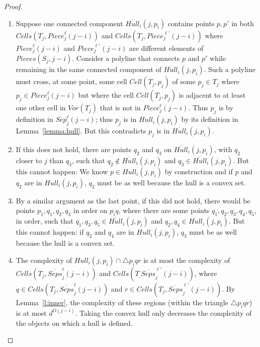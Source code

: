 \documentclass[10pt,a4paper]{amsart}
\newcommand{\Cell}{\mathit{Cell}}
\newcommand{\Cells}{\mathit{Cells}}
\newcommand{\Piece}{\mathit{Piece}}
\newcommand{\Sep}{\mathit{Sep}}
\newcommand{\Hull}{\mathit{Hull}}
\newcommand{\Voron}{\mathit{Vor}}
\begin{document}
\begin{proof}
    \begin{enumerate}
        \item \label{p1} Suppose one connected component $\overline{\Hull}_i(j,p_i)$ contains points $p,p'$ in  both 
    $\Cells(T_j,\Piece^\ell_j(j-i))$ and $\Cells(T_j,\Piece^{\ell'}_j(j-i))$ where $\Piece^\ell_j(j-i)$ and $\Piece^{\ell'}_j(j-i)$ are 
        different elements of $Pieces(S_j,j-i)$. Consider a polyline that connects $p$ and $p'$ while remaining in the same connected component of $\overline{\Hull}_i(j,p_i)$. Such a polyline must cross, at some point, some cell $\Cell(T_j,p_j)$ of some $p_j \in T_j$ where $p_j \in \Piece^\ell_j(j-i)$ but 
        where the cell $\Cell(T_j,p_j)$ is adjacent to at least one other cell in $\Voron(T_j)$ that is not in $\Piece^\ell_j(j-i)$.
        Thus $p_j$ is  by definition in $\Sep_j^\ell(j-i)$; thus $p_j$ is in $\Hull_i(j,p_i)$ by its definition in Lemma~\ref{lemma:hull}. But this contradicts $p_j$ is in  $\overline{\Hull}_i(j,p_i)$.
        \item \label{p2} 
        If this does not hold, there are points $q_2$ and $q_3$ on $\overline{\Hull}_i(j,p_i)$, with $q_2$ closer to $j$ than $q_3$, such that $q_2\not\in \overline{\Hull}_i(j,p_i)$ and $q_3 \in \overline{\Hull}_i(j,p_i)$.
         But this cannot happen: We know $p\in Hull_i(j,p_i)$ by construction and if $p$ and $q_2$ are in $Hull_i(j,p_i)$, $q_2$ must be as well because the hull is a convex set.
        \item \label{p3} 
        By a similar argument as the last point, if this did not hold, there would be points $p_1,q_1,q_2,q_3$ in order on $\overline{p_iq}$, where there are some points $q_1,q_2,q_3,q_4,q_5$, in order, such that $q_1,q_3,q_5\in \overline{\Hull}_i(j,p_i)$ and $q_2,q_4 \in \Hull_i(j,p_i)$. But this cannot happen: if $q_2$ and $q_4$ are in $\Hull_i(j,p_i)$, $q_3$ must be as well because the hull is a convex set.
        \item \label{p4} 
        The complexity of $\Hull_i(j,p_i) \cap \triangle p_iqr$ is at most the complexity
        of $\Cells(T_j,\overline{Seps}_j^\ell(j-i))$
        and $\Cells(T_,\overline{Seps}_j^{\ell'}(j-i))$, where 
        $q \in \Cells(T_j,\overline{Seps}_j^{\ell}(j-i))$ 
        and
        $r \in \Cells(T_j,\overline{Seps}_j^{\ell'}(j-i))$. 
        By Lemma~\ref{l:inner}, the complexity  of these regions (within the triangle $\triangle p_iqr$) is   at most $d^{O(j-i)}$. Taking the convex hull only decreases the complexity of the objects on which a hull is defined.
        
    \end{enumerate}
\end{proof}
\end{document}
